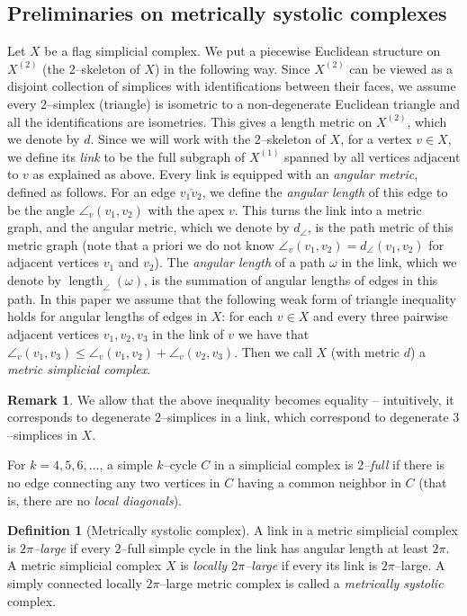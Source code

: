 \documentclass[11pt]{amsart}
\newcommand{\length}{\operatorname{length}}
\theoremstyle{definition}
\newtheorem{definition}[theorem]{Definition}
\newtheorem{remark}[theorem]{Remark}
\newcommand{\sk}[2]{#1^{(#2)}}
\begin{document}
\subsection{Preliminaries on metrically systolic complexes}
Let $X$ be a flag simplicial complex. We put a piecewise Euclidean structure on $\sk{X}{2}$ (the $2$--skeleton of $X$) in the following way. Since $\sk{X}{2}$ can be viewed as a disjoint collection of simplices with identifications between their faces, we assume every $2$--simplex (triangle) is isometric to a non-degenerate Euclidean triangle and all the identifications are isometries. This gives a length metric on $\sk{X}{2}$, which we denote by $d$. Since we will work with the $2$--skeleton of $X$, for a vertex $v\in X$, we define its \emph{link} to be the full subgraph of $\sk{X}{1}$
spanned by all vertices adjacent to $v$ as explained as above. Every link is equipped with an \emph{angular metric}, defined as follows. For an edge $\overline{v_1v_2}$, we define the \emph{angular length} of this edge to be the angle $\angle_v(v_1,v_2)$ with the apex $v$. This turns the link into a metric graph, and the angular metric, which we denote by $d_\angle$, is the path metric of this metric graph (note that a priori we do not know $\angle_v(v_1,v_2)=d_\angle(v_1,v_2)$ for adjacent vertices $v_1$ and $v_2$). The \emph{angular length} of a path $\omega$ in the link, which we denote by $\length_\angle(\omega)$, is the summation of angular lengths of edges in this path. In this paper we assume that the following weak form of triangle inequality
holds for angular lengths of edges in $X$: for each $v\in X$ and every three pairwise adjacent vertices $v_1,v_2,v_3$
in the link of $v$ we have that $\angle_v(v_1,v_3)\le \angle_v(v_1,v_2)+\angle_v(v_2,v_3)$.
Then we call $X$ (with metric $d$) a \emph{metric simplicial complex}.

\begin{remark}
We allow that the above inequality becomes equality -- intuitively, it corresponds to degenerate $2$--simplices
	in a link, which correspond to degenerate $3$--simplices in $X$.
\end{remark}

For $k=4,5,6,\ldots$, a simple $k$--cycle $C$ in a simplicial complex is \emph{$2$--full} if 
there is no edge connecting any two vertices in $C$ having a common neighbor in $C$ (that is, there
are no \emph{local diagonals}). 

\begin{definition}[Metrically systolic complex]
	\label{d:metric_syst}
	A link in a metric simplicial complex is \emph{$2\pi$--large} if every $2$--full
	simple cycle in the link has angular length at least $2\pi$.
	A metric simplicial complex $X$ is \emph{locally $2\pi$--large} if every its link is $2\pi$--large.
	A simply connected locally $2\pi$--large metric complex is called a \emph{metrically systolic} complex.
\end{definition}
\end{document}
